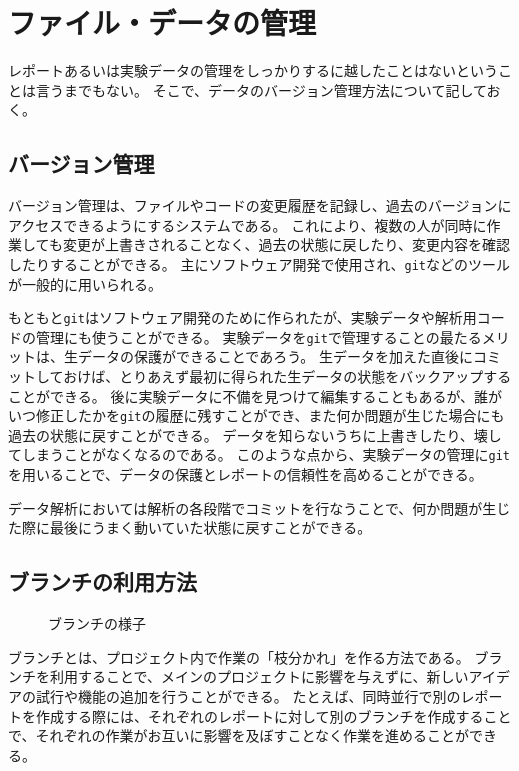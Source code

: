 \section{ファイル・データの管理}

レポートあるいは実験データの管理をしっかりするに越したことはないということは言うまでもない。
そこで、データのバージョン管理方法について記しておく。

\subsection{バージョン管理}
バージョン管理は、ファイルやコードの変更履歴を記録し、過去のバージョンにアクセスできるようにするシステムである。
これにより、複数の人が同時に作業しても変更が上書きされることなく、過去の状態に戻したり、変更内容を確認したりすることができる。
主にソフトウェア開発で使用され、\verb|git|などのツールが一般的に用いられる。

もともと\verb|git|はソフトウェア開発のために作られたが、実験データや解析用コードの管理にも使うことができる。
実験データを\verb|git|で管理することの最たるメリットは、生データの保護ができることであろう。
生データを加えた直後にコミットしておけば、とりあえず最初に得られた生データの状態をバックアップすることができる。
後に実験データに不備を見つけて編集することもあるが、誰がいつ修正したかを\verb|git|の履歴に残すことができ、また何か問題が生じた場合にも過去の状態に戻すことができる。
データを知らないうちに上書きしたり、壊してしまうことがなくなるのである。
このような点から、実験データの管理に\verb|git|を用いることで、データの保護とレポートの信頼性を高めることができる。

データ解析においては解析の各段階でコミットを行なうことで、何か問題が生じた際に最後にうまく動いていた状態に戻すことができる。


\subsection{ブランチの利用方法}

\begin{figure}[htbp]
    \centering
    
    \caption{ブランチの様子}
    \label{fig:branch}
\end{figure}

ブランチとは、プロジェクト内で作業の「枝分かれ」を作る方法である。
ブランチを利用することで、メインのプロジェクトに影響を与えずに、新しいアイデアの試行や機能の追加を行うことができる。
たとえば、同時並行で別のレポートを作成する際には、それぞれのレポートに対して別のブランチを作成することで、それぞれの作業がお互いに影響を及ぼすことなく作業を進めることができる。


